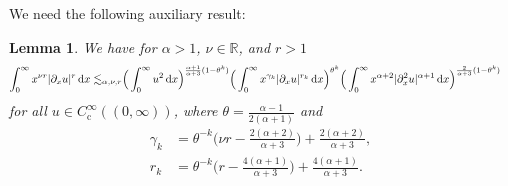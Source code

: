 \documentclass[reqno,12pt]{amsart}
\renewcommand{\d}{\ensuremath{\mathrm{d}}}
\newcommand{\R}{\ensuremath{\mathbb{R}}}
\renewcommand{\d}{\ensuremath{{\rm d}}}
\newtheorem{lemma}[theorem]{Lemma}
\numberwithin{equation}{section}
\begin{document}
We need the following auxiliary result:
%
\begin{lemma}\label{lem:recursion-dxu}
%
We have for $\alpha > 1$, $\nu \in \R$, and $r > 1$
%
\begin{equation}\label{eq:recursion-dxu}
\begin{split}
\int_0^\infty x^{\nu r} |\partial_x u|^r \, \d x
\lesssim_{\alpha,\nu,r} & \Big(  \int_0^\infty  u^2 \, \d x \Big)^{\frac{\alpha+1}{\alpha+3}(  1- \theta^k)} 
\Big( \int_0^\infty x^{\gamma_k} |\partial_x u|^{r_k} \, \d x \Big)^{\theta^k}%
\Big( \int_0^\infty  x^{\alpha+2} |\partial_x^2 u|^{\alpha+1} \, \d x\Big)^{\frac{2}{\alpha+3}(1- \theta^k)}
\end{split}
\end{equation}
%
for all $u \in C^\infty_\mathrm{c}((0,\infty))$, where $\theta = \frac{\alpha-1}{2 (\alpha+1)}$ and
%
\begin{subequations}\label{eq:gamma1-r1}
\begin{align}
\gamma_k &%
= \theta^{-k} \Big( \nu r - \frac{2(\alpha+2)}{\alpha+3} \Big) + \frac{2(\alpha+2)}{\alpha+3}, \label{eq:gamma1} \\
r_k &%
= \theta^{-k} \Big( r - \frac{4(\alpha+1)}{\alpha+3} \Big) + \frac{4(\alpha+1)}{\alpha+3}.\label{eq:r1}
\end{align}
\end{subequations}
%
\end{lemma}
\end{document}
